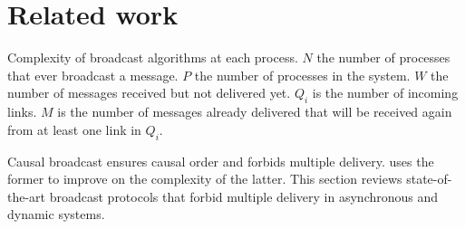 
\section{Related work}
\label{sec:relatedwork}

\begin{table*}
  \begin{center}
    \caption{\label{table:complexity} Complexity of broadcast algorithms at each
      process. $N$ the number of processes that ever broadcast a message. $P$
      the number of processes in the system. $W$ the number of messages received
      but not delivered yet. $Q_i$ is the number of incoming links. $M$ is the
      number of messages already delivered that will be received again from at
      least one link in $Q_i$.}
  
  \end{center}
\end{table*}

Causal broadcast ensures causal order and forbids multiple
delivery. \RPCBROADCAST uses the former to improve on the complexity of the
latter.  This section reviews state-of-the-art broadcast protocols that forbid
multiple delivery in asynchronous and dynamic systems.




